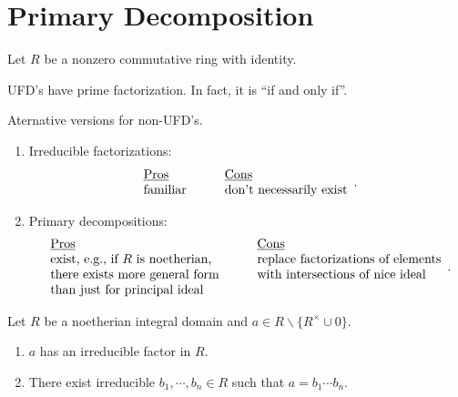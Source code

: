 \chapter{Primary Decomposition}

Let $R$ be a nonzero commutative ring with identity.

\begin{discussion}
    UFD's have prime factorization. In fact, it is ``if and only if''. \par 
    Aternative versions for non-UFD's.
    \begin{enumerate}
        \item Irreducible factorizations: 
            \[
                \begin{array}{llll}
                    \text{\underline{Pros}} &&& \text{\underline{Cons}} \\
                    \text{familiar} &&& \text{don't necessarily exist} 
                \end{array}.
            \]
        \item 
            Primary decompositions:
            \[
                \begin{array}{llll}
                    \text{\underline{Pros}} &&& \text{\underline{Cons}} \\
                    \text{exist, e.g., if $R$ is noetherian,} &&& \text{replace factorizations of elements} \\
                    \text{there exists more general form} &&& \text{with intersections of nice ideal} \\
                    \text{than just for principal ideal}
                \end{array}.
            \]
    \end{enumerate}
\end{discussion}

\begin{theorem}
    Let $R$ be a noetherian integral domain and $a \in R \smallsetminus \{R^{\times} \cup 0\}$.
    \begin{enumerate}
        \item $a$ has an irreducible factor in $R$.
        \item There exist irreducible $b_1,\cdots,b_n \in R$ such that $a = b_1 \cdots b_n$.
    \end{enumerate}
\end{theorem}

